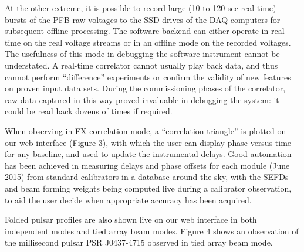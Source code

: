 
At the other extreme, it is possible to record large (10 to 120 sec real time) bursts of the PFB raw voltages to the SSD drives of the DAQ computers for subsequent offline processing. The software backend can either operate in real time on the real voltage streams or in an offline mode on the recorded voltages. The usefulness of this mode in debugging the software instrument cannot be understated. A real-time correlator cannot usually play back data, and thus cannot perform ``difference'' experiments or confirm the validity of new features on proven input data sets. During the commissioning phases of the correlator, raw data captured in this way proved invaluable in debugging the system: it could be read back dozens of times if required.

When observing in FX correlation mode, a ``correlation triangle'' is plotted on our web interface (Figure 3), with which the user can display phase versus time for any baseline, and used to update the instrumental delays. Good automation has been achieved in measuring delays and phase offsets for each module (June 2015) from standard calibrators in a database around the sky, with the SEFDs and beam forming weights being computed live during a calibrator observation, to aid the user decide when appropriate accuracy has been acquired.  

Folded pulsar profiles are also shown live on our web interface in both independent modes and tied array beam modes. Figure 4 shows an observation of the millisecond pulsar PSR J0437-4715 observed in tied array beam mode.
  